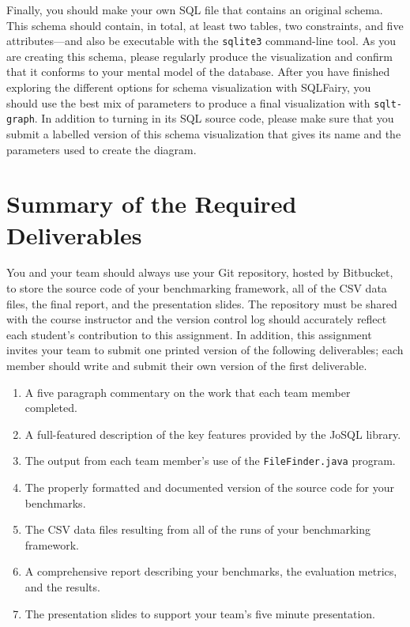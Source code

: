 Finally, you should make your own SQL file that contains an original schema.  This schema should contain, in total, at
least two tables, two constraints, and five attributes---and also be executable with the {\tt sqlite3} command-line
tool. As you are creating this schema, please regularly produce the visualization and confirm that it conforms to your
mental model of the database.  After you have finished exploring the different options for schema visualization with
SQLFairy, you should use the best mix of parameters to produce a final visualization with {\tt sqlt-graph}.  In addition
to turning in its SQL source code, please make sure that you submit a labelled version of this schema visualization that
gives its name and the parameters used to create the diagram. 


\section*{Summary of the Required Deliverables}

You and your team should always use your Git repository, hosted by Bitbucket, to store the source code of your
benchmarking framework, all of the CSV data files, the final report, and the presentation slides. The repository must be
shared with the course instructor and the version control log should accurately reflect each student's contribution to
this assignment. In addition, this assignment invites your team to submit one printed version of the following
deliverables; each member should write and submit their own version of the first deliverable. 


\begin{enumerate}
  \item A five paragraph commentary on the work that each team member completed. 
  \item A full-featured description of the key features provided by the JoSQL library.
  \item The output from each team member's use of the {\tt FileFinder.java} program.
  \item The properly formatted and documented version of the source code for your benchmarks.
  \item The CSV data files resulting from all of the runs of your benchmarking framework.
  \item A comprehensive report describing your benchmarks, the evaluation metrics, and the results.
    \item The presentation slides to support your team's five minute presentation.
\end{enumerate}

